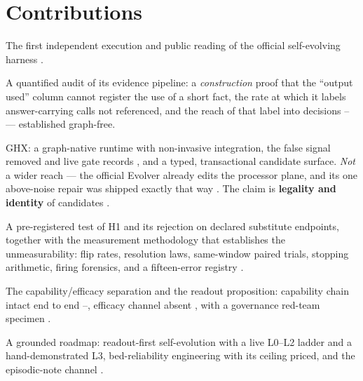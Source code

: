 \section{Contributions}
\label{sec:contributions}

\begin{description}[leftmargin=3.2em,style=nextline]
  \item[C1] The first independent execution and public reading of the
        official self-evolving harness .
  \item[C2] A quantified audit of its evidence pipeline: a
        \emph{construction} proof that the ``output used'' column cannot
        register the use of a short fact, the rate at which it labels
        answer-carrying calls not referenced, and the reach of that label
        into decisions -- --- established graph-free.
  \item[C3] GHX: a graph-native runtime with non-invasive integration, the
        false signal removed and live gate records , and a typed,
        transactional candidate surface. \emph{Not} a wider reach --- the
        official Evolver already edits the processor plane, and its one
        above-noise repair was shipped exactly that way . The claim
        is \textbf{legality and identity} of candidates .
  \item[C4] A pre-registered test of H1 and its rejection on declared
        substitute endpoints, together with the measurement methodology
        that establishes the unmeasurability: flip rates, resolution laws,
        same-window paired trials, stopping arithmetic, firing forensics,
        and a fifteen-error registry .
  \item[C5] The capability/efficacy separation and the readout proposition:
        capability chain intact end to end --, efficacy channel
        absent , with a governance red-team specimen
        .
  \item[C6] A grounded roadmap: readout-first self-evolution with a live
        L0--L2 ladder and a hand-demonstrated L3, bed-reliability
        engineering with its ceiling priced, and the episodic-note channel
        .
\end{description}

